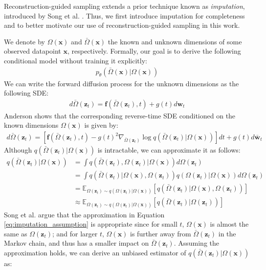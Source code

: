 \documentclass[ oneside,%
                    author={George Herbert},
                    degree={MSci},
                     title={Video Diffusion Models for Climate Simulations},
                  subtitle={}]{dissertation}
\begin{document}
Reconstruction-guided sampling extends a prior technique known as \textit{imputation}, introduced by Song et al. \cite{Score_Based_Song}. Thus, we first introduce imputation for completeness and to better motivate our use of reconstruction-guided sampling in this work.

We denote by $\Omega(\mathbf{x})$ and $\bar\Omega(\mathbf{x})$ the known and unknown dimensions of some observed datapoint $\mathbf{x}$, respectively. Formally, our goal is to derive the following conditional model without training it explicitly:
\begin{align}
      p_\theta(\bar\Omega(\mathbf{x})|\Omega(\mathbf{x}))
\end{align}
We can write the forward diffusion process for the unknown dimensions as the following SDE:
\begin{align}
      d\bar\Omega(\mathbf{z}_t)=\mathbf{f}(\bar\Omega(\mathbf{z}_t), t) + g(t)d\mathbf{w}_t
\end{align}
Anderson \cite{Reverse_Time_Diffusion_Anderson} shows that the corresponding reverse-time SDE conditioned on the known dimensions $\Omega(\mathbf{x})$ is given by:
\begin{align}
      d\bar\Omega(\mathbf{z}_t)=\left[\mathbf{f}(\bar\Omega(\mathbf{z}_t), t) - g(t)^2\nabla_{\bar\Omega(\mathbf{z}_t)}\log q(\bar\Omega(\mathbf{z}_t)|\Omega(\mathbf{x}))\right]dt + g(t)d \bar{\mathbf{w}}_t\label{eq:recon_reverse_sde}
\end{align}
Although $q(\bar\Omega(\mathbf{z}_t)|\Omega(\mathbf{x}))$ is intractable, we can approximate it as follows:
\begin{align}
      q(\bar\Omega(\mathbf{z}_t)|\Omega(\mathbf{x}))&=\int q(\bar\Omega(\mathbf{z}_t), \Omega(\mathbf{z}_t)|\Omega(\mathbf{x}))d\Omega(\mathbf{z}_t)\\
      &=\int q(\bar\Omega(\mathbf{z}_t)|\Omega(\mathbf{x}), \Omega(\mathbf{z}_t))q(\Omega(\mathbf{z}_t)|\Omega(\mathbf{x})) d\Omega(\mathbf{z}_t)\\
      &=\mathbb{E}_{\Omega(\mathbf{z}_t)\sim q(\Omega(\mathbf{z}_t)|\Omega(\mathbf{x}))}\left[q(\bar\Omega(\mathbf{z}_t)|\Omega(\mathbf{x}), \Omega(\mathbf{z}_t))\right]\\
      &\approx \mathbb{E}_{\Omega(\mathbf{z}_t)\sim q(\Omega(\mathbf{z}_t)|\Omega(\mathbf{x}))}\left[q(\bar\Omega(\mathbf{z}_t)| \Omega(\mathbf{z}_t))\right]\label{eq:imputation_assumption}
\end{align}
Song et al. \cite{Score_Based_Song} argue that the approximation in Equation \ref{eq:imputation_assumption} is appropriate since for small $t$, $\Omega(\mathbf{x})$ is almost the same as $\Omega(\mathbf{z}_t)$; and for larger $t$, $\Omega(\mathbf{x})$ is further away from $\bar\Omega(\mathbf{z}_t)$ in the Markov chain, and thus has a smaller impact on $\bar\Omega(\mathbf{z}_t)$. Assuming the approximation holds, we can derive an unbiased estimator of $q(\bar\Omega(\mathbf{z}_t)|\Omega(\mathbf{x}))$ as:
\end{document}
